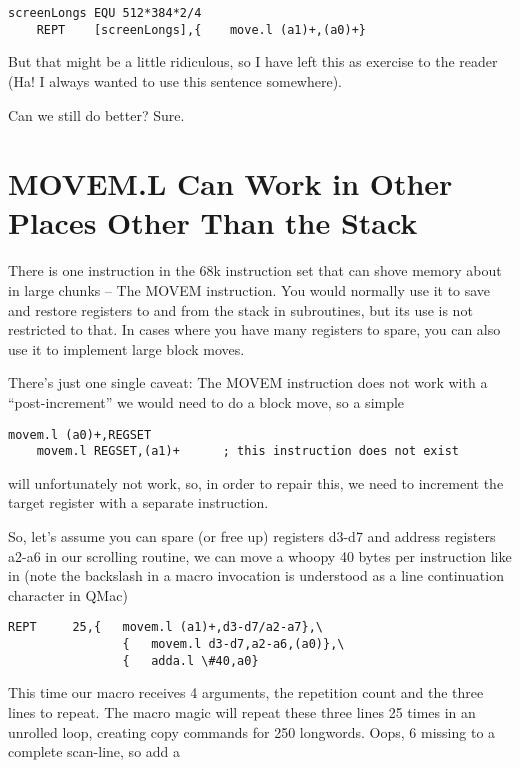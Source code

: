 \begin{lstlisting}[firstnumber=1,caption={Unrolling the outer loop}]
screenLongs EQU 512*384*2/4
    REPT    [screenLongs],{    move.l (a1)+,(a0)+}
\end{lstlisting}

But that might be a little ridiculous, so I have left this as exercise
to the reader (Ha! I always wanted to use this sentence somewhere).

Can we still do better? Sure.

\section{MOVEM.L Can Work in Other Places Other Than the Stack}

There is one instruction in the 68k instruction set that can shove
memory about in large chunks -- The MOVEM instruction. You would
normally use it to save and restore registers to and from the stack in
subroutines, but its use is not restricted to that. In cases where you
have many registers to spare, you can also use it to implement large
block moves.

There's just one single caveat: The MOVEM instruction does not work with
a ``post-increment'' we would need to do a block move, so a simple

\begin{lstlisting}[firstnumber=1,caption={MOVEM restrictions}]
    movem.l (a0)+,REGSET
    movem.l REGSET,(a1)+      ; this instruction does not exist
\end{lstlisting}

will unfortunately not work, so, in order to repair this, we need to
increment the target register with a separate instruction.

So, let's assume you can spare (or free up) registers d3-d7 and address
registers a2-a6 in our scrolling routine, we can move a whoopy 40 bytes
per instruction like in (note the backslash in a macro invocation is
understood as a line continuation character in QMac)

\begin{lstlisting}[firstnumber=1,caption={Improving the REPT macro}]
    REPT     25,{   movem.l (a1)+,d3-d7/a2-a7},\
                {   movem.l d3-d7,a2-a6,(a0)},\
                {   adda.l \#40,a0}
\end{lstlisting}

This time our macro receives 4 arguments, the repetition count and the
three lines to repeat. The macro magic will repeat these three lines 25
times in an unrolled loop, creating copy commands for 250 longwords.
Oops, 6 missing to a complete scan-line, so add a

